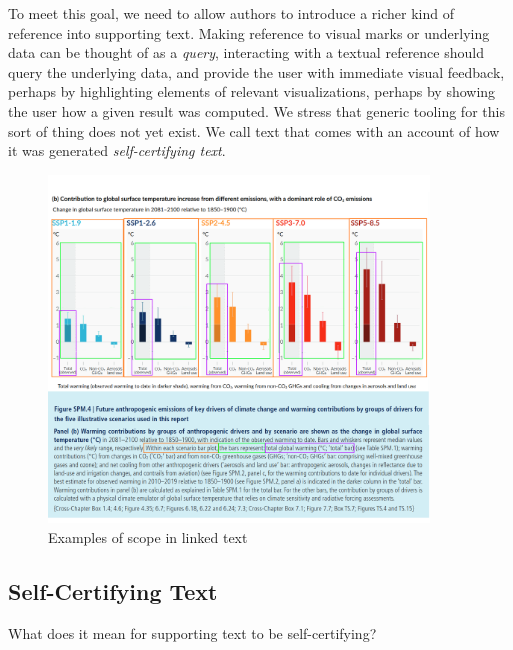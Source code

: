 To meet this goal, we need to allow authors to introduce a richer kind of reference into supporting
text. Making reference to visual marks or underlying data can be thought of as a \emph{query},
interacting with a textual reference should query the underlying data, and provide the user with immediate
visual feedback, perhaps by highlighting elements of relevant visualizations, perhaps by showing the user
how a given result was computed. We stress that generic tooling for this sort of thing does not yet exist.
We call text that comes with an account of how it was generated \emph{self-certifying text}.

\begin{figure}
   \includegraphics[width=0.9\textwidth]{fig/ipcc-visual-elements.png}
   \caption{Examples of scope in linked text}
   \label{fig:visual-element-scope}
\end{figure}

\subsection{Self-Certifying Text}
What does it mean for supporting text to be self-certifying? 

